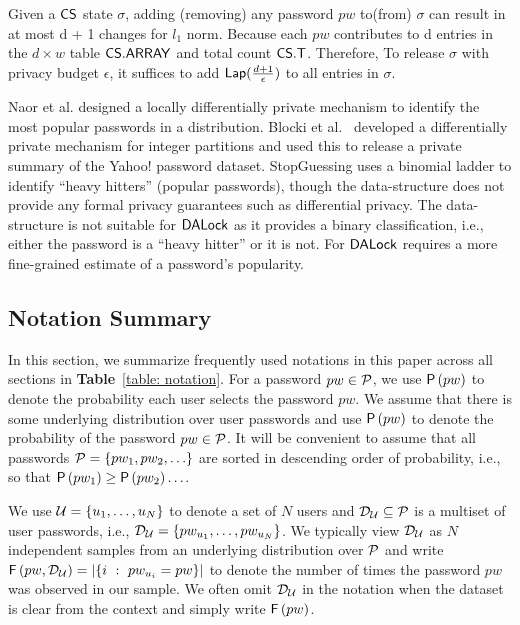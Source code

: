  Given a $\mathsf{CS}$ state $\sigma$, adding (removing) any password $pw$ to(from) $\sigma$ can result in at most d + 1 changes for $l_1$ norm. Because each $pw$ contributes to d entries in the $d \times w$ table $\mathsf{CS.ARRAY}$ and total count $\mathsf{CS.T}$. Therefore, To release $\sigma$ with privacy budget $\epsilon$, it suffices to add $\mathsf{Lap}(\frac{d+1}{\epsilon})$ to all entries in $\sigma$. 

 Naor et al.\cite{CCS:NaoPinRon19} designed a locally differentially private mechanism to identify the most popular passwords in a distribution. Blocki et al.~\cite{NDSS:BloDatBon16} developed a differentially private mechanism for integer partitions and used this to release a private summary of the Yahoo! password dataset. StopGuessing\cite{EuroSP:THS19} uses a binomial ladder to identify ``heavy hitters'' (popular passwords), though the data-structure does not provide any formal privacy guarantees such as differential privacy. The data-structure is not suitable for $\mathsf{DALock}$ as it provides a binary classification, i.e., either the password is a ``heavy hitter'' or it is not. For $\mathsf{DALock}$ requires a more fine-grained estimate of a password’s popularity. 


\vspace{-0.3cm}
\subsection{Notation Summary}
\vspace{-0.2cm}
In this section, we summarize frequently used notations in this paper across all sections in \textbf{Table}~\ref{table: notation}.  For a password $pw \in \mathcal{P}$, we use $\mathsf{P}\left(pw\right)$ to denote the probability each user selects the password $pw$. We assume that there is some underlying distribution over user passwords and use $\mathsf{P}\left(pw\right)$ to denote the probability of the password $pw \in \mathcal{P}$. It will be convenient to assume that all passwords $ \mathcal{P} = \{pw_1,pw_2,\ldots \}$ are sorted in descending order of probability, i.e., so that $\mathsf{P}\left(pw_1\right) \geq \mathsf{P}\left(pw_2\right) \ldots $. %


We use $\mathcal{U} = \{u_1,\ldots,u_N\}$ to denote a set of $N$ users and $\mathcal{D}_{{\mathcal{U}}} \subseteq \mathcal{P}$ is a multiset of user passwords, i.e., $\mathcal{D}_{{\mathcal{U}}} = \{pw_{u_1},\ldots,pw_{u_N}\}$. We typically view $\mathcal{D}_{{\mathcal{U}}}$ as $N$ independent samples from an underlying distribution over $\mathcal{P}$ and write $\mathsf{F}\left(pw, \mathcal{D}_{{\mathcal{U}}} \right)= \left| \left\{ i ~:~pw_{u_i} = pw \right\} \right|$ to denote the number of times the password $pw$ was observed in our sample. We often omit $\mathcal{D}_{{\mathcal{U}}}$ in the notation when the dataset is clear from the context and simply write $\mathsf{F}\left(pw\right)$. 

